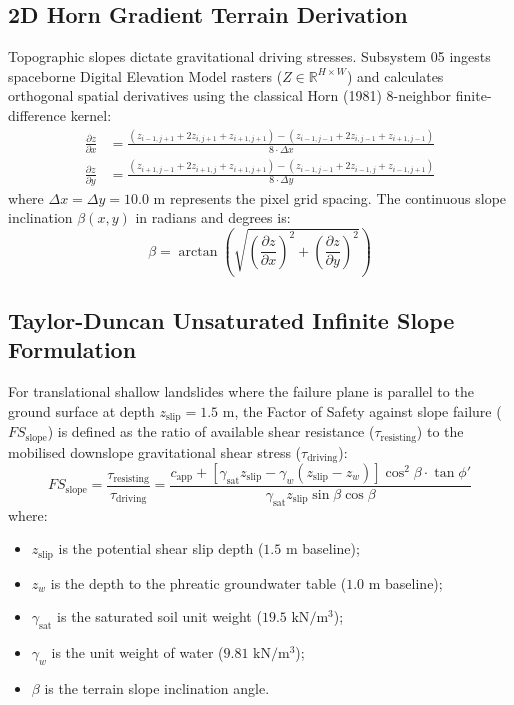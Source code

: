 \documentclass[11pt,a4paper]{article}
\theoremstyle{definition}
\theoremstyle{remark}
\begin{document}
\subsection{2D Horn Gradient Terrain Derivation}
Topographic slopes dictate gravitational driving stresses. Subsystem 05 ingests spaceborne Digital Elevation Model rasters ($Z \in \mathbb{R}^{H \times W}$) and calculates orthogonal spatial derivatives using the classical Horn (1981) 8-neighbor finite-difference kernel:
\begin{align}
    \frac{\partial z}{\partial x} &= \frac{(z_{i-1, j+1} + 2 z_{i, j+1} + z_{i+1, j+1}) - (z_{i-1, j-1} + 2 z_{i, j-1} + z_{i+1, j-1})}{8 \cdot \Delta x} \\
    \frac{\partial z}{\partial y} &= \frac{(z_{i+1, j-1} + 2 z_{i+1, j} + z_{i+1, j+1}) - (z_{i-1, j-1} + 2 z_{i-1, j} + z_{i-1, j+1})}{8 \cdot \Delta y}
\end{align}
where $\Delta x = \Delta y = 10.0\text{ m}$ represents the pixel grid spacing. The continuous slope inclination $\beta(x, y)$ in radians and degrees is:
\begin{equation}
    \beta = \arctan\left( \sqrt{ \left( \frac{\partial z}{\partial x} \right)^2 + \left( \frac{\partial z}{\partial y} \right)^2 } \right)
\end{equation}

\subsection{Taylor-Duncan Unsaturated Infinite Slope Formulation}
For translational shallow landslides where the failure plane is parallel to the ground surface at depth $z_{\text{slip}} = 1.5\text{ m}$, the Factor of Safety against slope failure ($FS_{\text{slope}}$) is defined as the ratio of available shear resistance ($\tau_{\text{resisting}}$) to the mobilised downslope gravitational shear stress ($\tau_{\text{driving}}$):
\begin{equation}
    FS_{\text{slope}} = \frac{\tau_{\text{resisting}}}{\tau_{\text{driving}}} = \frac{c_{\text{app}} + \left[ \gamma_{\text{sat}} z_{\text{slip}} - \gamma_w (z_{\text{slip}} - z_w) \right] \cos^2 \beta \cdot \tan \phi'}{\gamma_{\text{sat}} z_{\text{slip}} \sin \beta \cos \beta}
    \label{eq:slope_fs_full}
\end{equation}
\noindent where:
\begin{itemize}
    \item $z_{\text{slip}}$ is the potential shear slip depth ($1.5\text{ m}$ baseline);
    \item $z_w$ is the depth to the phreatic groundwater table ($1.0\text{ m}$ baseline);
    \item $\gamma_{\text{sat}}$ is the saturated soil unit weight ($19.5\text{ kN}/\text{m}^3$);
    \item $\gamma_w$ is the unit weight of water ($9.81\text{ kN}/\text{m}^3$);
    \item $\beta$ is the terrain slope inclination angle.
\end{itemize}
\end{document}
